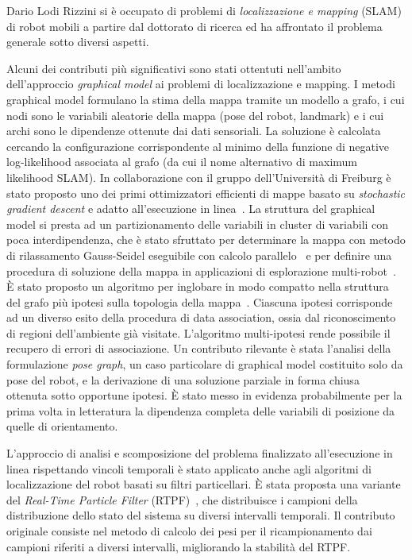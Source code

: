 \documentclass[11pt]{article}
\begin{document}
\begin{itemize}
Dario Lodi Rizzini si \`e occupato di problemi di  \emph{localizzazione e mapping} (SLAM) di robot mobili a partire dal dottorato di ricerca ed ha affrontato il problema generale sotto diversi aspetti.

Alcuni dei contributi pi\`u significativi sono stati ottentuti nell'ambito dell'approccio \emph{graphical model} ai problemi di localizzazione e mapping. 
I metodi graphical model formulano la stima della mappa tramite un modello a grafo, i cui nodi sono le variabili aleatorie della mappa (pose del robot, landmark) e i cui archi sono le dipendenze ottenute dai dati sensoriali. 
La soluzione \`e calcolata cercando la configurazione corrispondente al minimo della funzione di negative log-likelihood associata al grafo (da cui il nome alternativo di maximum likelihood SLAM). 
In collaborazione con il gruppo dell'Universit\`a di Freiburg \`e stato proposto uno dei primi ottimizzatori efficienti di mappe basato su \emph{stochastic gradient descent} e adatto all'esecuzione in linea~\cite{grisetti2008icra,lodirizzini2009ras}. 
La struttura del graphical model si presta ad un partizionamento delle variabili in cluster di variabili con poca interdipendenza, che \`e stato sfruttato per determinare la mappa con metodo di rilassamento Gauss-Seidel eseguibile con calcolo parallelo~\cite{lodirizzini2009iros} e per definire una procedura di soluzione della mappa in applicazioni di esplorazione multi-robot~\cite{lodirizzini2010iros,lodirizzini2010graphbot}. 
\`E stato proposto un algoritmo per inglobare in modo compatto nella struttura del grafo pi\`u ipotesi sulla topologia della mappa~\cite{lodirizzini2011icra}. 
Ciascuna ipotesi corrisponde ad un diverso esito della procedura di data association, ossia dal riconoscimento di regioni dell'ambiente gi\`a visitate. 
L'algoritmo multi-ipotesi rende possibile il recupero di errori di associazione. 
Un contributo rilevante \`e stata l'analisi della formulazione \emph{pose graph}, un caso particolare di graphical model costituito solo da pose del robot, e la derivazione di una soluzione parziale in forma chiusa~\cite{lodirizzini2009ecmr,lodirizzini2009icar} ottenuta sotto opportune ipotesi. 
\`E stato messo in evidenza probabilmente per la prima volta in letteratura la dipendenza completa delle variabili di posizione da quelle di orientamento. 

L'approccio di analisi e scomposizione del problema finalizzato all'esecuzione in linea rispettando vincoli temporali \`e stato applicato anche agli algoritmi di localizzazione del robot basati su filtri particellari. 
\`E stata proposta una variante del \emph{Real-Time Particle Filter} (RTPF)~\cite{lodirizzini2007icinco,lodirizzini2007ecmr,lodirizzini2008improved}, che distribuisce i campioni della distribuzione dello stato del sistema su diversi intervalli temporali. 
Il contributo originale consiste nel metodo di calcolo dei pesi per il ricampionamento dai campioni riferiti a diversi intervalli, migliorando la stabilit\`a del RTPF. 


\end{itemize}
\end{document}
